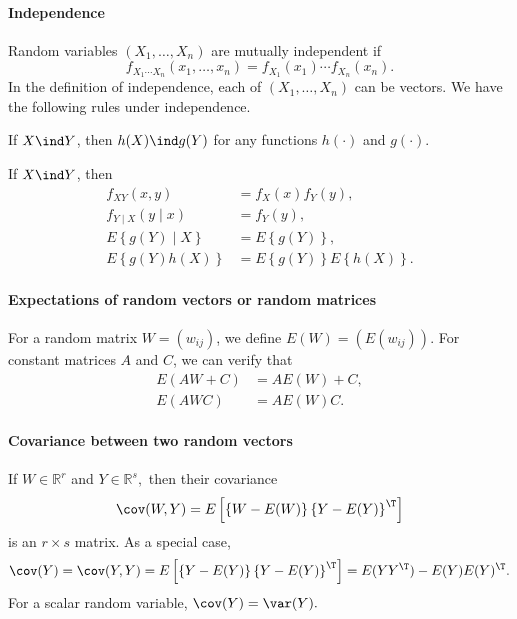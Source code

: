 \paragraph*{Independence}

Random variables $(X_{1},\ldots,X_{n})$ are mutually independent
if 
$$
f_{X_{1}\cdots X_{n}}(x_{1},\ldots,x_{n})=f_{X_{1}}(x_{1})\cdots f_{X_{n}}(x_{n}).
$$
In the definition of independence, each of $(X_{1},\ldots,X_{n})$ can
be vectors. We have the following rules under independence.


\begin{proposition}
 If $X\ind Y$, then $h(X)\ind g(Y)$ for any functions
$h(\cdot)$ and $g(\cdot)$.
\end{proposition}

\begin{proposition}
If $X\ind Y$, then
\begin{align*}
f_{XY}(x,y) & =f_{X}(x)f_{Y}(y),\\
f_{Y\mid X}(y\mid x) & =f_{Y}(y),\\
E\left\{ g(Y)\mid X\right\}  & =E\left\{ g(Y)\right\} ,\\
E\left\{ g(Y)h(X)\right\}  & =E\left\{ g(Y)\right\} E\left\{ h(X)\right\} .
\end{align*}
\end{proposition}



\paragraph*{Expectations of random vectors or random matrices}

For a random matrix $W=(w_{ij})$, we define $E(W)=(E(w_{ij}))$.
For constant matrices $A$ and $C$, we can verify that
\begin{align*}
E(AW+C) & =AE(W)+C,\\
E(AWC) & =AE(W)C.
\end{align*}


\paragraph*{Covariance between two random vectors}

If $W\in\mathbb{R}^{r}$ and $Y\in\mathbb{R}^{s},$ then their covariance 
$$
\cov(W,Y)=E\left[\left\{ W-E(W)\right\} \left\{ Y-E(Y)\right\} ^{\T}\right]
$$
is an $r\times s$ matrix. 
As a special case, 
$$
\cov(Y)=\cov(Y,Y)=E\left[\left\{ Y-E(Y)\right\} \left\{ Y-E(Y)\right\} ^{\T}\right]
= E(YY^{\T}) - E(Y) E(Y)^{\T}. 
$$
For a scalar random variable, $\cov(Y)=\var(Y).$

